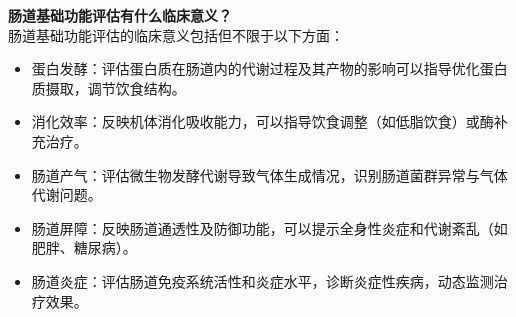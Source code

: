 \documentclass[UTF8]{ctexart}
\begin{document}
\begin{tcolorbox}[
    enhanced,
    colback=lightpurple!10, %
    colframe=white,  %
    arc=3mm,
    boxrule=0.5pt,
    width=\textwidth,
    top=8pt,
    bottom=8pt
]
{\small{\color{lightpurple}\faQuestionCircle}\quad \textbf{肠道基础功能评估有什么临床意义？}\\
{\color{orange!50}\faComments}\quad 肠道基础功能评估的临床意义包括但不限于以下方面：
\begin{itemize}
    \item 蛋白发酵：评估蛋白质在肠道内的代谢过程及其产物的影响可以指导优化蛋白质摄取，调节饮食结构。
    \item 消化效率：反映机体消化吸收能力，可以指导饮食调整（如低脂饮食）或酶补充治疗。
    \item 肠道产气：评估微生物发酵代谢导致气体生成情况，识别肠道菌群异常与气体代谢问题。
    \item 肠道屏障：反映肠道通透性及防御功能，可以提示全身性炎症和代谢紊乱（如肥胖、糖尿病）。
    \item 肠道炎症：评估肠道免疫系统活性和炎症水平，诊断炎症性疾病，动态监测治疗效果。
\end{itemize}
}
\end{tcolorbox}
\vspace{-0.5cm}
\end{document}
